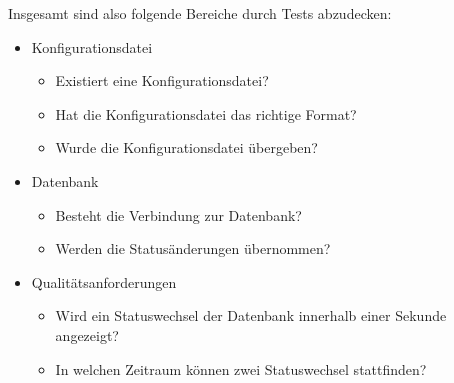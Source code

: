 \documentclass{scrartcl}
\begin{document}
Insgesamt sind also folgende Bereiche durch Tests abzudecken:
\begin{itemize}
	\item Konfigurationsdatei
	\begin{itemize}
		\item Existiert eine Konfigurationsdatei?
		\item Hat die Konfigurationsdatei das richtige Format?
		\item Wurde die Konfigurationsdatei übergeben?
	\end{itemize}
	\item Datenbank
	\begin{itemize}
		\item Besteht die Verbindung zur Datenbank?
		\item Werden die Statusänderungen übernommen?
	\end{itemize}
	\item Qualitätsanforderungen
	\begin{itemize}
		\item Wird ein Statuswechsel der Datenbank innerhalb einer Sekunde angezeigt?
		\item In welchen Zeitraum können zwei Statuswechsel stattfinden?
	\end{itemize}
\end{itemize}
\end{document}
